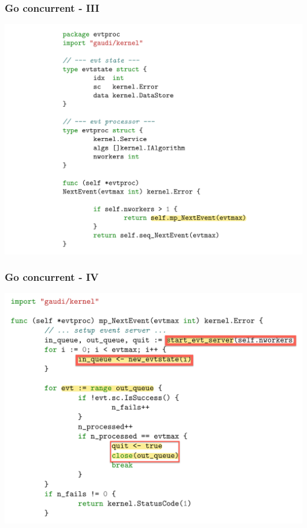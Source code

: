 \documentclass[bigger]{beamer}
\begin{document}
\begin{frame}
\frametitle{Go concurrent - III}
\label{sec-1-12}


\includegraphics[width=.9\linewidth]{figs/evtproc-mp-next-evt-0-go.pdf}
\end{frame}
\begin{frame}
\frametitle{Go concurrent - IV}
\label{sec-1-13}


\includegraphics[width=.9\linewidth]{figs/evtproc-mp-next-evt-1-go.pdf}
\end{frame}
\end{document}
